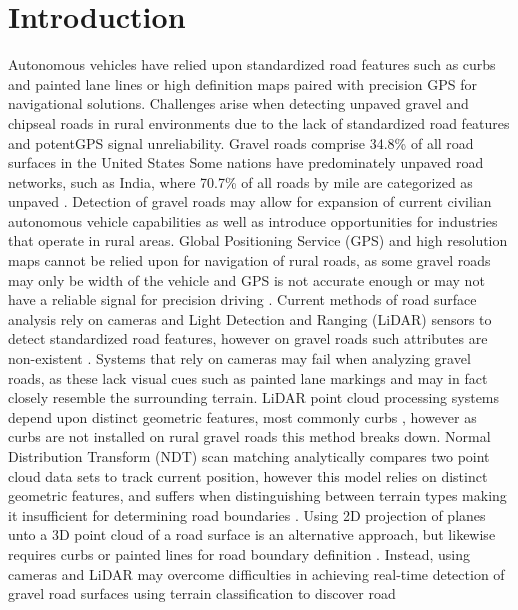 \documentclass[journal,onecolumn]{IEEEtran}
\begin{document}
%	
%	
%	
%	
%	

\section{Introduction}
	

	Autonomous vehicles have relied upon standardized road features such as curbs and painted lane lines or high definition maps paired with precision GPS for navigational solutions. Challenges arise when detecting unpaved gravel and chipseal roads in rural environments due to the lack of standardized road features and potentGPS signal unreliability. Gravel roads comprise 34.8\% \cite{road_stats_2} of all road surfaces in the United States Some nations have predominately unpaved road networks, such as India, where 70.7\% of all roads by mile are categorized as unpaved \cite{malik_lal_2019}. Detection of gravel roads may allow for expansion of current civilian autonomous vehicle capabilities as well as introduce opportunities for industries that operate in rural areas. Global Positioning Service (GPS) and high resolution maps cannot be relied upon for navigation of rural roads, as some gravel roads may only be width of the vehicle and GPS is not accurate enough or may not have a reliable signal for precision driving \cite{noauthor_gpsgov_nodate}. Current methods of road surface analysis rely on cameras and Light Detection and Ranging (LiDAR) sensors to detect standardized road features, however on gravel roads such attributes are non-existent \cite{skorseth_gravel_nodate}. Systems that rely on cameras may fail when analyzing gravel roads, as these lack visual cues such as painted lane markings \cite{crisman_scarf_1993} and may in fact closely resemble the surrounding terrain. LiDAR point cloud processing systems depend upon distinct geometric features, most commonly curbs \cite{yadav_extraction_2017,liu_new_2013,qiu_fast_2016,fernandes_road_2014,seker_experiments_nodate,yang_semi-automated_2013,miyazaki_line-based_2014,hervieu_road_2013,smadja_road_nodate}, however as curbs are not installed on rural gravel roads \cite{skorseth_gravel_nodate} this method breaks down. Normal Distribution Transform (NDT) scan matching analytically compares two point cloud data sets to track current position, however this model relies on distinct geometric features, and suffers when distinguishing between terrain types making it insufficient for determining road boundaries \cite{biber_normal_2003}. Using 2D projection of planes unto a 3D point cloud of a road surface is an alternative approach, but likewise requires curbs or painted lines for road boundary definition \cite{fernandes_road_2014, borkar_robust_2009-1, guo_lane_2015}. Instead, using cameras and LiDAR may overcome difficulties in achieving real-time detection of gravel road surfaces using terrain classification to discover road 
\end{document}
